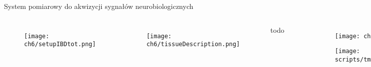 \begin{frame}{System pomiarowy do akwizycji sygnałów neurobiologicznych}
    \begin{columns}

        \vspace{-2em}


        \begin{figure}[H]
            \centering 
            \texttt{[image: ch6/setupIBDtot.png]}  
        \end{figure}
\vspace{-2em}
\begin{columns}

        \begin{figure}[H]
            \centering 
            \texttt{[image: ch6/tissueDescription.png]}  
        \end{figure}
        \begin{block}{todo}
            
        \end{block}
    \end{columns}
        \vspace{-2em}

        \begin{figure}[H]
        
        
            \begin{subfigure}{0.25\textwidth}
                \texttt{[image: ch6/meaLFPnexus.pdf]}
             \end{subfigure}
                \hspace{-2em}
             \begin{subfigure}{0.7\textwidth}
                \texttt{[image: scripts/tmp/signal\_MEA\_LFP\_wide.pdf]}
             \end{subfigure}
        \end{figure}

    \end{columns}

\end{frame}

   
